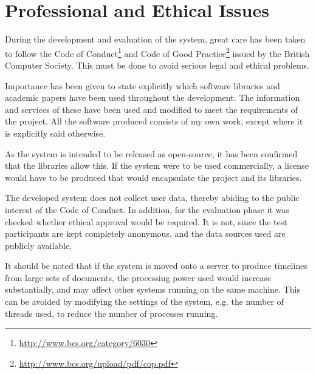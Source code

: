\chapter{Professional and Ethical Issues}
\par During the development and evaluation of the system, great care has been taken to follow the Code of Conduct\footnote{\url{http://www.bcs.org/category/6030}} and Code of Good Practice\footnote{\url{http://www.bcs.org/upload/pdf/cop.pdf}} issued by the British Computer Society. This must be done to avoid serious legal and ethical problems.

\par Importance has been given to state explicitly which software libraries and academic papers have been used throughout the development. The information and services of these have been used and modified to meet the requirements of the project. All the software produced consists of my own work, except where it is explicitly said otherwise. 

\par As the system is intended to be released as open-source, it has been confirmed that the libraries allow this. If the system were to be used commercially, a license would have to be produced that would encapsulate the project and its libraries.

\par The developed system does not collect user data, thereby abiding to the public interest of the Code of Conduct. In addition, for the evaluation phase it was checked whether ethical approval would be required. It is not, since the test participants are kept completely anonymous, and the data sources used are publicly available.

\par It should be noted that if the system is moved onto a server to produce timelines from large sets of documents, the processing power used would increase substantially, and may affect other systems running on the same machine. This can be avoided by modifying the settings of the system, e.g. the number of threads used, to reduce the number of processes running.

